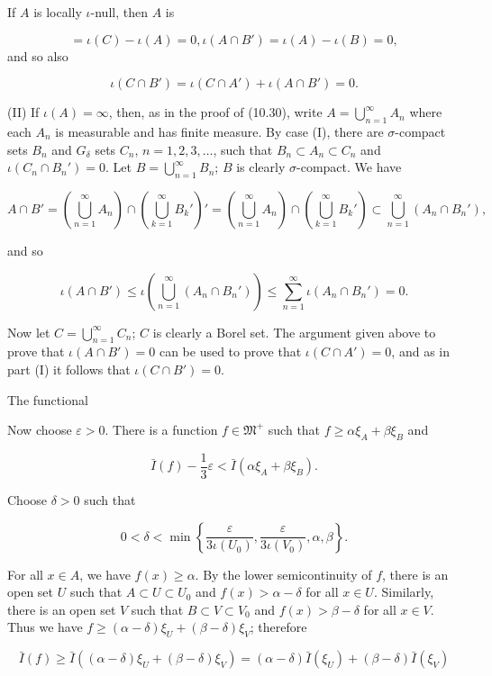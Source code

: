If $A$ is locally $\iota$-null, then $A$ is

$$= \iota(C) - \iota(A) = 0, \iota(A \cap B') = \iota(A) - \iota(B) = 0,$$ and so also

$$\iota(C \cap B') = \iota(C \cap A') + \iota(A \cap B') = 0.$$

(II) If $\iota(A) = \infty$, then, as in the proof of (10.30), write $A = \bigcup_{n=1}^{\infty} A_n$ where each $A_n$ is measurable and has finite measure. By case (I), there are $\sigma$-compact sets $B_n$ and $G_\delta$ sets $C_n$, $n = 1, 2, 3, \ldots$, such that $B_n \subset A_n \subset C_n$ and $\iota(C_n \cap B_n') = 0$. Let $B = \bigcup_{n=1}^{\infty} B_n$; $B$ is clearly $\sigma$-compact. We have

$$A \cap B' = \left( \bigcup_{n=1}^{\infty} A_n \right) \cap \left( \bigcup_{k=1}^{\infty} B_k' \right)' = \left( \bigcup_{n=1}^{\infty} A_n \right) \cap \left( \bigcup_{k=1}^{\infty} B_k' \right) \subset \bigcup_{n=1}^{\infty} (A_n \cap B_n'),$$

and so

$$\iota(A \cap B') \leq \iota\left( \bigcup_{n=1}^{\infty} (A_n \cap B_n') \right) \leq \sum_{n=1}^{\infty} \iota(A_n \cap B_n') = 0.$$

Now let $C = \bigcup_{n=1}^{\infty} C_n$; $C$ is clearly a Borel set. The argument given above to prove that $\iota(A \cap B') = 0$ can be used to prove that $\iota(C \cap A') = 0$, and as in part (I) it follows that $\iota(C \cap B') = 0.$

The functional

Now choose $\varepsilon > 0$. There is a function $f \in \mathfrak{M}^+$ such that $f \geq \alpha \xi_A + \beta \xi_B$ and

$$\bar{I}(f) - \frac{1}{3} \varepsilon < \bar{I}(\alpha \xi_A + \beta \xi_B).$$

Choose $\delta > 0$ such that

$$0 < \delta < \min \left\{ \frac{\varepsilon}{3 \iota(U_0)}, \frac{\varepsilon}{3 \iota(V_0)}, \alpha, \beta \right\}.$$

For all $x \in A$, we have $f(x) \geq \alpha$. By the lower semicontinuity of $f$, there is an open set $U$ such that $A \subset U \subset U_0$ and $f(x) > \alpha - \delta$ for all $x \in U$. Similarly, there is an open set $V$ such that $B \subset V \subset V_0$ and $f(x) > \beta - \delta$ for all $x \in V$. Thus we have $f \geq (\alpha - \delta) \xi_U + (\beta - \delta) \xi_V$; therefore

$$\bar{I}(f) \geq \bar{I}((\alpha - \delta) \xi_U + (\beta - \delta) \xi_V) = (\alpha - \delta) \bar{I}(\xi_U) + (\beta - \delta) \bar{I}(\xi_V)$$

